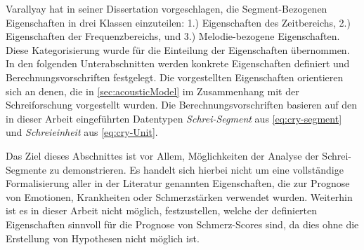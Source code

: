 Varallyay \cite[S. 16 - 17]{cry_thesis} hat in seiner Dissertation vorgeschlagen, die Segment-Bezogenen Eigenschaften in drei Klassen einzuteilen: 1.) Eigenschaften des Zeitbereichs, 2.) Eigenschaften der Frequenzbereichs, und 3.) Melodie-bezogene Eigenschaften. Diese Kategorisierung wurde für die Einteilung der Eigenschaften übernommen. In den folgenden Unterabschnitten werden konkrete Eigenschaften definiert und Berechnungsvorschriften festgelegt. Die vorgestellten Eigenschaften orientieren sich an denen, die in \autoref{sec:acousticModel} im Zusammenhang mit der Schreiforschung vorgestellt wurden. Die Berechnungsvorschriften basieren auf den in dieser Arbeit eingeführten Datentypen \emph{Schrei-Segment} aus \autoref{eq:cry-segment} und \emph{Schreieinheit} aus \autoref{eq:cry-Unit}.

Das Ziel dieses Abschnittes ist vor Allem, Möglichkeiten der Analyse der Schrei-Segmente zu demonstrieren. Es handelt sich hierbei nicht um eine vollständige Formalisierung aller in der Literatur genannten Eigenschaften, die zur Prognose von Emotionen, Krankheiten oder Schmerzstärken verwendet wurden. Weiterhin ist es in dieser Arbeit nicht möglich, festzustellen, welche der definierten Eigenschaften sinnvoll für die Prognose von Schmerz-Scores sind, da dies ohne die Erstellung von Hypothesen nicht möglich ist.



